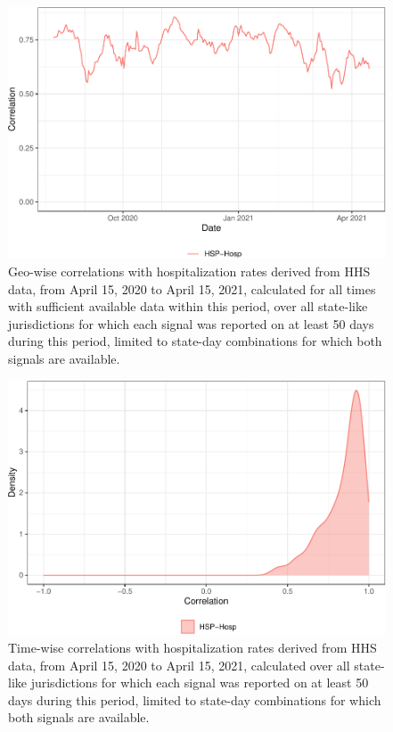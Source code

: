 \begin{figure}

{\centering \includegraphics[width=\textwidth]{fig/hosp-correlations-by-time-1}

}

\caption{Geo-wise correlations with hospitalization rates derived from HHS data, from April 15, 2020 to April 15, 2021, calculated for all times with sufficient available data within this period, over all state-like jurisdictions for which each signal was reported on at least 50 days during this period, limited to state-day combinations for which both signals are available.}\label{fig:hosp-correlations-by-time}
\end{figure}

\begin{figure}

{\centering \includegraphics[width=\textwidth]{fig/hosp-correlations-by-state-1}

}

\caption{Time-wise correlations with hospitalization rates derived from HHS data, from April 15, 2020 to April 15, 2021, calculated over all state-like jurisdictions for which each signal was reported on at least 50 days during this period, limited to state-day combinations for which both signals are available.}\label{fig:hosp-correlations-by-state}
\end{figure}